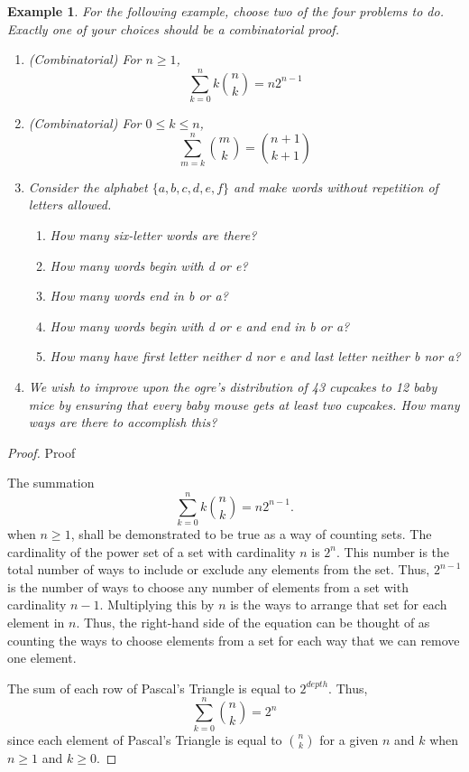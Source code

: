 \documentclass[11pt,titlepage]{article}		%
\theoremstyle{theorem}
\newtheorem{example}[theorem]{Example}
\begin{document}
\begin{example}
For the following example, choose two of the four problems to do. Exactly one of your choices should be a combinatorial proof.

\begin{enumerate}
    \item (Combinatorial) For $n\ge 1$,
    \[
        \sum\limits_{k=0}^n k \binom{n}{k} = n 2^{n-1}
    \]
    
    \item (Combinatorial) For $0\le k \le n$,
    \[
        \sum\limits_{m=k}^n \binom{m}{k} = \binom{n+1}{k+1}
    \]
    \item Consider the alphabet $\{a,b,c,d,e,f\}$ and make words without repetition of letters allowed.
        \begin{enumerate}
            \item How many six-letter words are there?
            \item How many words begin with \textit{d} or \textit{e}?
            \item How many words end in \textit{b} or \textit{a}?
            \item How many words begin with \textit{d} or \textit{e} and end in \textit{b} or \textit{a}?
            \item How many have first letter neither \textit{d} nor \textit{e} and last letter neither \textit{b} nor \textit{a}?
        \end{enumerate}
    \item We wish to improve upon the ogre's distribution of 43 cupcakes to 12 baby mice by ensuring that every baby mouse gets at least \textit{two} cupcakes. How many ways are there to accomplish this?
\end{enumerate}

\end{example}
\begin{proof}
Proof

The summation 
    \[
        \sum\limits_{k=0}^n k \binom{n}{k} = n 2^{n-1}.
    \]
when $n\ge 1$, shall be demonstrated to be true as a way of counting sets. The cardinality of the power set of a set with cardinality $n$ is $2^n$. This number is the total number of ways to include or exclude any elements from the set. Thus, $2^{n-1}$ is the number of ways to choose any number of elements from a set with cardinality $n-1$. Multiplying this by $n$ is the ways to arrange that set for each element in $n$. Thus, the right-hand side of the equation can be thought of as counting the ways to choose elements from a set for each way that we can remove one element.

The sum of each row of Pascal's Triangle is equal to $2^{depth}$. Thus, 
    \[
        \sum\limits_{k=0}^n \binom{n}{k} = 2^{n}
    \]
since each element of Pascal's Triangle is equal to $\binom{n}{k}$ for a given $n$ and $k$ when $n \ge 1$ and $k \ge 0$.
\end{proof}
\end{document}
